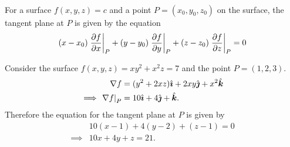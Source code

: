 \documentclass[../multivariate_calculus.tex]{subfiles}
\begin{document}
        \paragraph{}
        For a surface $f(x,y,z)=c$ and a point $P=(x_0,y_0,z_0)$ on the surface, the tangent plane at $P$ is given by the equation
        \begin{equation}
            (x-x_0)\left.\pdv{f}{x}\right|_P+(y-y_0)\left.\pdv{f}{y}\right|_P+(z-z_0)\left.\pdv{f}{z}\right|_P=0
        \end{equation}
        \begin{example}
            Consider the surface $f(x,y,z)=xy^2+x^2z=7$ and the point $P=(1,2,3)$.
            \begin{align}
                \nabla f&=(y^2+2xz)\hat{\boldsymbol{\imath}}+2xy\hat{\boldsymbol{\jmath}}+x^2\hat{\boldsymbol{k}}\\
                \implies\left.\nabla f\right|_P&=10\hat{\boldsymbol{\imath}}+4\hat{\boldsymbol{\jmath}}+\hat{\boldsymbol{k}}.
            \end{align}
            Therefore the equation for the tangent plane at $P$ is given by
            \begin{align}
                &10(x-1)+4(y-2)+(z-1)=0\\
                \implies&10x+4y+z=21.
            \end{align}
        \end{example}
\end{document}
